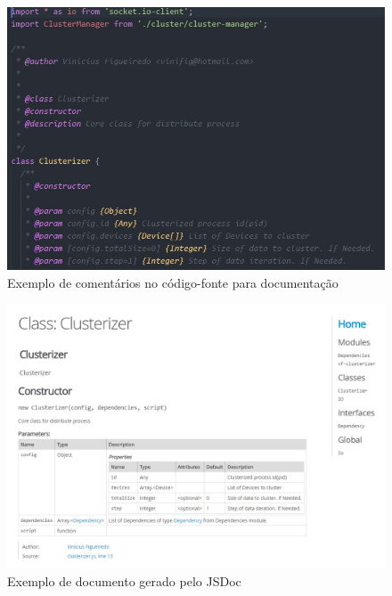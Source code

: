 \begin{figure}[htb]
	\caption{\label{fig:jsdoc-js}Exemplo de comentários no código-fonte para documentação}
	\begin{center}
		\includegraphics[width=1\textwidth]{img/jsdoc-js.jpg}
	\end{center}
\end{figure}

\begin{figure}[htb]
	\caption{\label{fig:jsdoc-html}Exemplo de documento gerado pelo JSDoc}
	\begin{center}
		\includegraphics[width=1\textwidth]{img/jsdoc-html.jpg}
	\end{center}
\end{figure}

